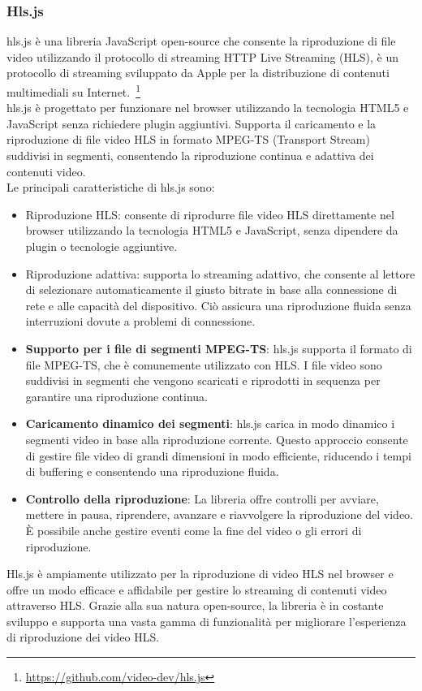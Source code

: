 \subsubsection{Hls.js}
hls.js è una libreria JavaScript open-source che consente la riproduzione di file video utilizzando il protocollo di streaming HTTP Live Streaming (HLS), è un protocollo di streaming sviluppato da Apple per la distribuzione di contenuti multimediali su Internet.~\footnote{\url{https://github.com/video-dev/hls.js}}\\
hls.js è progettato per funzionare nel browser utilizzando la tecnologia HTML5 e JavaScript senza richiedere plugin aggiuntivi. Supporta il caricamento e la riproduzione di file video HLS in formato MPEG-TS (Transport Stream) suddivisi in segmenti, consentendo la riproduzione continua e adattiva dei contenuti video.\\

Le principali caratteristiche di hls.js sono:
\begin{itemize}
    \item{Riproduzione HLS}: consente di riprodurre file video HLS direttamente nel browser utilizzando la tecnologia HTML5 e JavaScript, senza dipendere da plugin o tecnologie aggiuntive.
    \item{Riproduzione adattiva}: supporta lo streaming adattivo, che consente al lettore di selezionare automaticamente il giusto bitrate in base alla connessione di rete e alle capacità del dispositivo. Ciò assicura una riproduzione fluida senza interruzioni dovute a problemi di connessione.
    \item \textbf{Supporto per i file di segmenti MPEG-TS}: hls.js supporta il formato di file MPEG-TS, che è comunemente utilizzato con HLS. I file video sono suddivisi in segmenti che vengono scaricati e riprodotti in sequenza per garantire una riproduzione continua.
    \item \textbf{Caricamento dinamico dei segmenti}: hls.js carica in modo dinamico i segmenti video in base alla riproduzione corrente. Questo approccio consente di gestire file video di grandi dimensioni in modo efficiente, riducendo i tempi di buffering e consentendo una riproduzione fluida.
    \item \textbf{Controllo della riproduzione}: La libreria offre controlli per avviare, mettere in pausa, riprendere, avanzare e riavvolgere la riproduzione del video. È possibile anche gestire eventi come la fine del video o gli errori di riproduzione.
\end{itemize}
Hls.js è ampiamente utilizzato per la riproduzione di video HLS nel browser e offre un modo efficace e affidabile per gestire lo streaming di contenuti video attraverso HLS. Grazie alla sua natura open-source, la libreria è in costante sviluppo e supporta una vasta gamma di funzionalità per migliorare l'esperienza di riproduzione dei video HLS.
